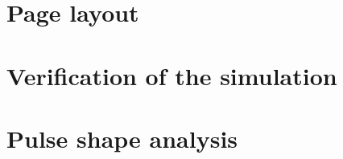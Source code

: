 \documentclass[11pt, a4paper]{article}
\begin{document}


\tableofcontents

\pagebreak \setcounter{page}{1} 


\section{Page layout}
\label{sec:manual}

\layout

\section{Verification of the simulation}
\label{sec:verify}

\section{Pulse shape analysis}
\label{sec:physics}


\clearpage
 
\end{document}

